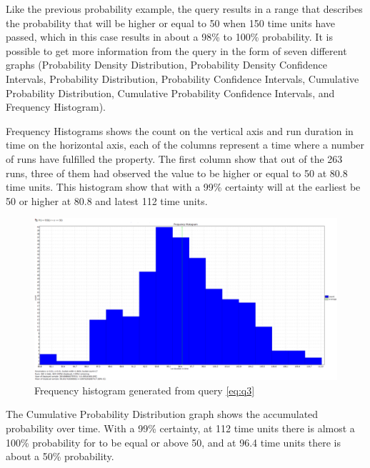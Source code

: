 Like the previous probability example, the query results in a range that describes the probability that  will be higher or equal to 50 when 150 time units have passed, which in this case results in about a 98\% to 100\% probability.
It is possible to get more information from the query in the form of seven different graphs (Probability Density Distribution, Probability Density Confidence Intervals, Probability Distribution, Probability Confidence Intervals, Cumulative Probability Distribution, Cumulative Probability Confidence Intervals, and Frequency Histogram). 

Frequency Histograms shows the count on the vertical axis and run duration in time on the horizontal axis, each of the columns represent a time where a number of runs have fulfilled the property.
The first column show that out of the 263 runs, three of them had observed the value  to be higher or equal to 50 at 80.8 time units.
This histogram show that with a 99\% certainty  will at the earliest be 50 or higher at 80.8 and latest 112 time units.

\begin{figure}[!h]
	\includegraphics[width=\textwidth]{graphics/eq3fh.png}
	\caption{Frequency histogram generated from query \ref{eq:q3}}
	\label{fig:eq3fh}
\end{figure}

The Cumulative Probability Distribution graph shows the accumulated probability over time.
With a 99\% certainty, at 112 time units there is almost a 100\% probability for  to be equal or above 50, and at 96.4 time units there is about a 50\% probability.

